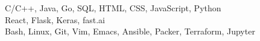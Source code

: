 
C/C++, Java, Go, SQL, HTML, CSS, JavaScript, Python\\
React, Flask, Keras, fast.ai\\
Bash, Linux, Git, Vim, Emacs, Ansible, Packer, Terraform, Jupyter\\
